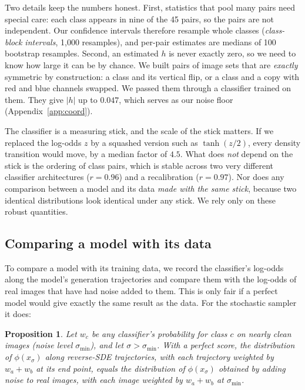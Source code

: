 \documentclass[11pt]{article}
\newtheorem{proposition}{Proposition}
\begin{document}
Two details keep the numbers honest. First, statistics that pool many pairs need special care: each class appears in nine of the 45 pairs, so the pairs are not independent. Our confidence intervals therefore resample whole classes (\emph{class-block intervals}, 1{,}000 resamples), and per-pair estimates are medians of 100 bootstrap resamples. Second, an estimated $h$ is never exactly zero, so we need to know how large it can be by chance. We built pairs of image sets that are \emph{exactly} symmetric by construction: a class and its vertical flip, or a class and a copy with red and blue channels swapped. We passed them through a classifier trained on them. They give $|h|$ up to $0.047$, which serves as our noise floor (Appendix~\ref{app:coord}).

The classifier is a measuring stick, and the scale of the stick matters. If we replaced the log-odds $z$ by a squashed version such as $\tanh(z/2)$, every density transition would move, by a median factor of $4.5$. What does \emph{not} depend on the stick is the ordering of class pairs, which is stable across two very different classifier architectures ($r=0.96$) and a recalibration ($r=0.97$). Nor does any comparison between a model and its data \emph{made with the same stick}, because two identical distributions look identical under any stick. We rely only on these robust quantities.

\subsection{Comparing a model with its data}
\label{sec:compare}

To compare a model with its training data, we record the classifier's log-odds along the model's generation trajectories and compare them with the log-odds of real images that have had noise added to them. This is only fair if a perfect model would give exactly the same result as the data. For the stochastic sampler it does:

\begin{proposition}
\label{prop:joint}
Let $w_c$ be any classifier's probability for class $c$ on nearly clean images (noise level $\sigma_{\min}$), and let $\sigma>\sigma_{\min}$. With a perfect score, the distribution of $\phi(x_\sigma)$ along reverse-SDE trajectories, with each trajectory weighted by $w_a+w_b$ at its end point, equals the distribution of $\phi(x_\sigma)$ obtained by adding noise to real images, with each image weighted by $w_a+w_b$ at $\sigma_{\min}$.
\end{proposition}
\end{document}
